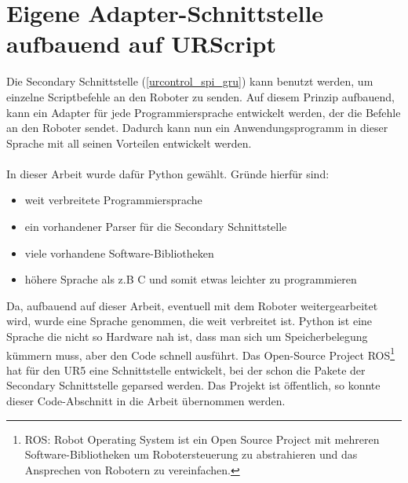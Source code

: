 \section{Eigene Adapter-Schnittstelle aufbauend auf URScript}
\label{sec:urscript_adapter}

Die Secondary Schnittstelle (\ref{urcontrol_spi_gru}) kann benutzt werden, um einzelne Scriptbefehle an den Roboter zu senden. Auf diesem Prinzip aufbauend, kann ein Adapter für jede Programmiersprache entwickelt werden, der die Befehle an den Roboter sendet. Dadurch kann nun ein Anwendungsprogramm in dieser Sprache mit all seinen Vorteilen entwickelt werden.
\\\\
In dieser Arbeit wurde dafür Python gewählt. Gründe hierfür sind:

\begin{itemize}
\item weit verbreitete Programmiersprache
\item ein vorhandener Parser für die Secondary Schnittstelle
\item viele vorhandene Software-Bibliotheken
\item höhere Sprache als z.B C und somit etwas leichter zu programmieren
\end{itemize}

Da, aufbauend auf dieser Arbeit, eventuell mit dem Roboter weitergearbeitet wird, wurde eine Sprache genommen, die weit verbreitet ist. Python ist eine Sprache die nicht so Hardware nah ist, dass man sich um Speicherbelegung kümmern muss, aber den Code schnell ausführt.
Das Open-Source Project ROS\footnote{ROS: Robot Operating System ist ein Open Source Project mit mehreren Software-Bibliotheken um Robotersteuerung zu abstrahieren und das Ansprechen von Robotern zu vereinfachen.} hat für den UR5 eine Schnittstelle entwickelt, bei der schon die Pakete der Secondary Schnittstelle geparsed werden. Das Projekt ist öffentlich, so konnte dieser Code-Abschnitt in die Arbeit übernommen werden.